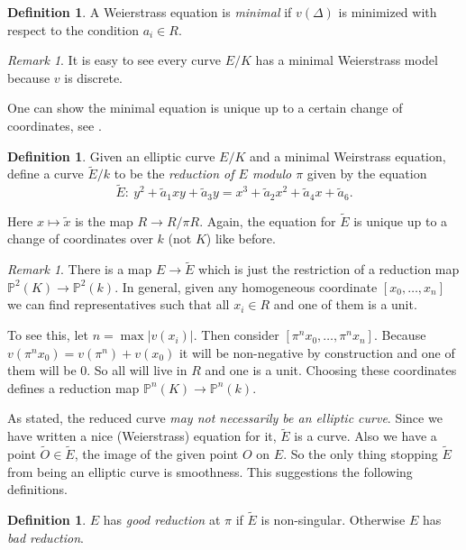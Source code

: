 \documentclass[11pt]{article}
\newcommand{\BB}[1]{\mathbb{#1}} %
\newcommand{\PP}{\BB{P}}
\theoremstyle{plain}%
\theoremstyle{definition}
\newtheorem{defn}[thm]{Definition}
\theoremstyle{remark}
\newtheorem{rem}[thm]{Remark}
\begin{document}
\begin{defn} %
	A Weierstrass equation is \emph{minimal} if $v(\Delta)$ is minimized with respect to the condition $a_i\in R$.
\end{defn}
\begin{rem}
	It is easy to see every curve $E/K$ has a minimal Weierstrass model because $v$ is discrete.
\end{rem}

One can show the minimal equation is unique up to a certain change of coordinates, see \cite[VII.2 Prop. 1.3]{silverman1}.

\begin{defn} %
	Given an elliptic curve $E/K$ and a minimal Weirstrass equation, define a curve $\tilde{E}/k$ to be the \emph{reduction of $E$ modulo $\pi$} given by the equation
	$$
	\tilde{E} : \
	y^2 + \tilde{a}_1xy + \tilde{a}_3y
	=
	x^3 + \tilde{a}_2x^2 + \tilde{a}_4x + \tilde{a}_6.
	$$
\end{defn}
Here $x\mapsto\tilde{x}$ is the map $R\to R/\pi R$. Again, the equation for $\tilde{E}$ is unique up to a change of coordinates over $k$ (not $K$) like before.

\begin{rem}
	There is a map $E\to\tilde{E}$ which is just the restriction of a reduction map $\PP^2(K)\to\PP^2(k)$. In general, given any homogeneous coordinate $[x_0,\dots,x_n]$ we can find representatives such that all $x_i\in R$ and one of them is a unit.
	
	To see this, let $n = \max|v(x_i)|$. Then consider $[\pi^nx_0,\dots,\pi^nx_n]$. Because $v(\pi^nx_0)=v(\pi^n)+v(x_0)$ it will be non-negative by construction and one of them will be $0$. So all will live in $R$ and one is a unit. Choosing these coordinates defines a reduction map $\PP^n(K)\to\PP^n(k)$.
\end{rem}


As stated, the reduced curve \emph{may not necessarily be an elliptic curve}. Since we have written a nice (Weierstrass) equation for it, $\tilde{E}$ is a curve. Also we have a point $\tilde{O}\in\tilde{E}$, the image of the given point $O$ on $E$. So the only thing stopping $\tilde{E}$ from being an elliptic curve is smoothness. This suggestions the following definitions.

\begin{defn} %
	$E$ has \emph{good reduction} at $\pi$ if $\tilde{E}$ is non-singular. Otherwise $E$ has \emph{bad reduction}.
\end{defn}
\end{document}

